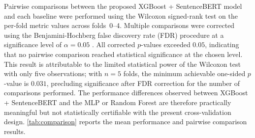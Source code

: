 Pairwise comparisons between the proposed XGBoost + SentenceBERT model and
each baseline were performed using the Wilcoxon signed-rank test on the
per-fold metric values across folds~0--4.  Multiple comparisons were corrected
using the Benjamini-Hochberg false discovery rate (FDR) procedure at a
significance level of $\alpha = 0.05$ \citep{benjamini1995controlling}.  All
corrected $p$-values exceeded $0.05$, indicating that no pairwise comparison
reached statistical significance at the chosen level.  This result is
attributable to the limited statistical power of the Wilcoxon test with only
five observations; with $n = 5$ folds, the minimum achievable one-sided
$p$-value is $0.031$, precluding significance after FDR correction for the
number of comparisons performed.  The performance differences observed between
XGBoost + SentenceBERT and the MLP or Random Forest are therefore practically
meaningful but not statistically certifiable with the present cross-validation
design.  \cref{tab:comparison} reports the mean performance and pairwise
comparison results.

